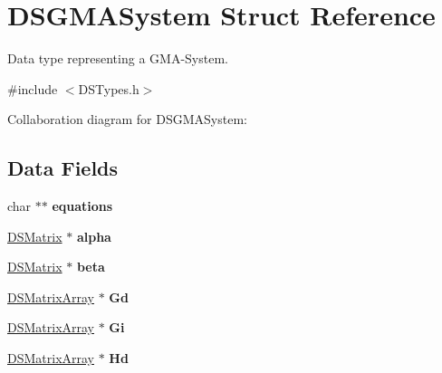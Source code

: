 \hypertarget{struct_d_s_g_m_a_system}{
\section{DSGMASystem Struct Reference}
\label{struct_d_s_g_m_a_system}
}


Data type representing a GMA-\/System.  




{\ttfamily \#include $<$DSTypes.h$>$}



Collaboration diagram for DSGMASystem:\subsection*{Data Fields}
\begin{DoxyCompactItemize}
\item 
\hypertarget{struct_d_s_g_m_a_system_af359cac84c0852ea6846009021b61da3}{
char $\ast$$\ast$ {\bfseries equations}}
\label{struct_d_s_g_m_a_system_af359cac84c0852ea6846009021b61da3}

\item 
\hypertarget{struct_d_s_g_m_a_system_a3d42a9503ac28b35558ac1138c0bd0fc}{
\hyperlink{struct_d_s_matrix}{DSMatrix} $\ast$ {\bfseries alpha}}
\label{struct_d_s_g_m_a_system_a3d42a9503ac28b35558ac1138c0bd0fc}

\item 
\hypertarget{struct_d_s_g_m_a_system_a1bb699dd7e2b8dadbb12f86cb9697004}{
\hyperlink{struct_d_s_matrix}{DSMatrix} $\ast$ {\bfseries beta}}
\label{struct_d_s_g_m_a_system_a1bb699dd7e2b8dadbb12f86cb9697004}

\item 
\hypertarget{struct_d_s_g_m_a_system_acdf77ac56f2229762c650415d1fc53ed}{
\hyperlink{struct_d_s_matrix_array}{DSMatrixArray} $\ast$ {\bfseries Gd}}
\label{struct_d_s_g_m_a_system_acdf77ac56f2229762c650415d1fc53ed}

\item 
\hypertarget{struct_d_s_g_m_a_system_aab7953fe5487c282f8ab07f3c7a55257}{
\hyperlink{struct_d_s_matrix_array}{DSMatrixArray} $\ast$ {\bfseries Gi}}
\label{struct_d_s_g_m_a_system_aab7953fe5487c282f8ab07f3c7a55257}

\item 
\hypertarget{struct_d_s_g_m_a_system_a512e6ff827f3a69d68e5f3400e02a55f}{
\hyperlink{struct_d_s_matrix_array}{DSMatrixArray} $\ast$ {\bfseries Hd}}
\label{struct_d_s_g_m_a_system_a512e6ff827f3a69d68e5f3400e02a55f}


\end{DoxyCompactItemize}
